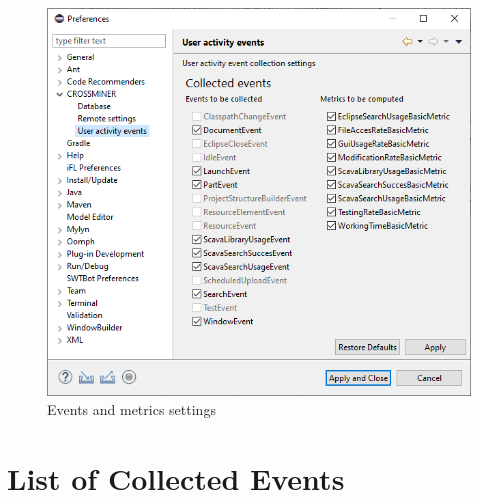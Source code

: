 \documentclass[11pt,a4paper]{book}
\begin{document}
\begin{figure}[h]
	\centering
	\includegraphics[width=\linewidth]{pic/usermonitor_settings.png}
	\caption{Events and metrics settings}
	\label{fig:useractivity:settings}
\end{figure}


\section{List of Collected Events}
\end{document}
